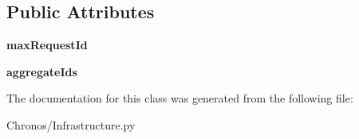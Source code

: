 \subsection*{Public Attributes}
\begin{DoxyCompactItemize}
\item 
{\bfseries max\+Request\+Id}
\item 
{\bfseries aggregate\+Ids}
\end{DoxyCompactItemize}


The documentation for this class was generated from the following file\+:\begin{DoxyCompactItemize}
\item 
Chronos/Infrastructure.\+py\end{DoxyCompactItemize}
